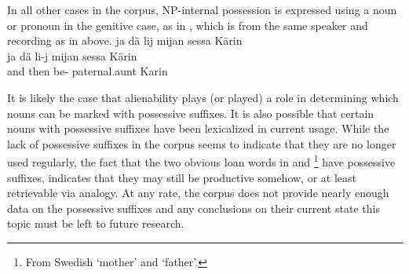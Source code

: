 In all other cases in the corpus, NP-internal possession is expressed using a noun or pronoun in the genitive case, as in , which is from the same speaker and recording as in  above.
\ea\label{noPossSuffix1}
\glll	ja dä lij mijan sessa Kärin\\
	ja dä li-j mijan sessa Kärin\\
	and then be-  paternal.aunt\BS{} Karin \\\nopagebreak
{}	
\z

It is likely the case that alienability plays (or played) a role in determining which nouns can be marked with possessive suffixes. It is also possible that certain nouns with possessive suffixes have been lexicalized in current usage. %
While the lack of possessive suffixes in the corpus seems to indicate that they are no longer used regularly, the fact that the two obvious loan words in  and \footnote{From Swedish  ‘mother’ and  ‘father’.} 
have possessive suffixes, indicates that they may still be productive somehow, or at least retrievable via analogy. At any rate, the corpus does not provide nearly enough data on the possessive suffixes and any conclusions on their current state this topic must be left to future research.


%
